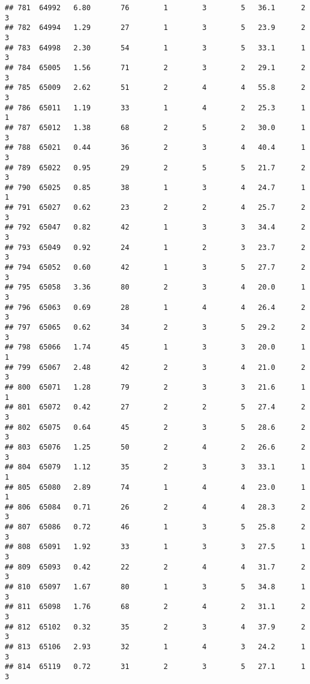 \documentclass[
]{article}
\begin{document}
\begin{verbatim}
## 781  64992   6.80       76        1        3        5   36.1      2      3
## 782  64994   1.29       27        1        3        5   23.9      2      3
## 783  64998   2.30       54        1        3        5   33.1      1      3
## 784  65005   1.56       71        2        3        2   29.1      2      3
## 785  65009   2.62       51        2        4        4   55.8      2      3
## 786  65011   1.19       33        1        4        2   25.3      1      1
## 787  65012   1.38       68        2        5        2   30.0      1      3
## 788  65021   0.44       36        2        3        4   40.4      1      3
## 789  65022   0.95       29        2        5        5   21.7      2      3
## 790  65025   0.85       38        1        3        4   24.7      1      1
## 791  65027   0.62       23        2        2        4   25.7      2      3
## 792  65047   0.82       42        1        3        3   34.4      2      3
## 793  65049   0.92       24        1        2        3   23.7      2      3
## 794  65052   0.60       42        1        3        5   27.7      2      3
## 795  65058   3.36       80        2        3        4   20.0      1      3
## 796  65063   0.69       28        1        4        4   26.4      2      3
## 797  65065   0.62       34        2        3        5   29.2      2      3
## 798  65066   1.74       45        1        3        3   20.0      1      1
## 799  65067   2.48       42        2        3        4   21.0      2      3
## 800  65071   1.28       79        2        3        3   21.6      1      1
## 801  65072   0.42       27        2        2        5   27.4      2      3
## 802  65075   0.64       45        2        3        5   28.6      2      3
## 803  65076   1.25       50        2        4        2   26.6      2      3
## 804  65079   1.12       35        2        3        3   33.1      1      1
## 805  65080   2.89       74        1        4        4   23.0      1      1
## 806  65084   0.71       26        2        4        4   28.3      2      3
## 807  65086   0.72       46        1        3        5   25.8      2      3
## 808  65091   1.92       33        1        3        3   27.5      1      3
## 809  65093   0.42       22        2        4        4   31.7      2      3
## 810  65097   1.67       80        1        3        5   34.8      1      3
## 811  65098   1.76       68        2        4        2   31.1      2      3
## 812  65102   0.32       35        2        3        4   37.9      2      3
## 813  65106   2.93       32        1        4        3   24.2      1      3
## 814  65119   0.72       31        2        3        5   27.1      1      3

\end{verbatim}
\end{document}
